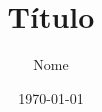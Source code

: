 \documentclass[12pt]{article}
\title{Título}
\author{Nome}
\date{\today}
\begin{document}
\maketitle

\newpage

\nocite{*}




\end{document}
